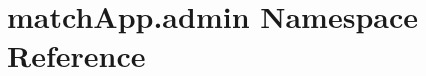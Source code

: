 \hypertarget{namespacematch_app_1_1admin}{}\section{match\+App.\+admin Namespace Reference}
\label{namespacematch_app_1_1admin}
